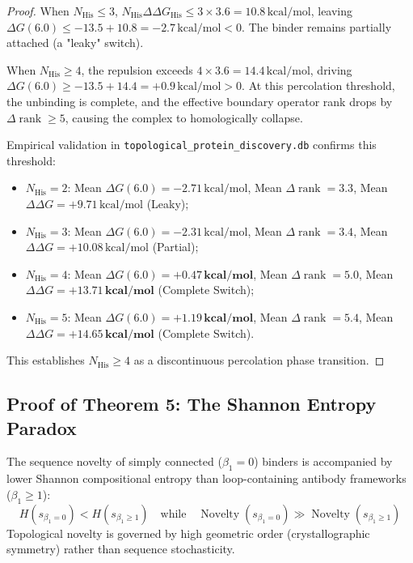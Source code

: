 \begin{proof}
When $N_{\text{His}} \le 3$, $N_{\text{His}} \Delta\Delta G_{\text{His}} \le 3 \times 3.6 = 10.8\,\text{kcal/mol}$, leaving $\Delta G(6.0) \le -13.5 + 10.8 = -2.7\,\text{kcal/mol} < 0$. The binder remains partially attached (a "leaky" switch). 

When $N_{\text{His}} \ge 4$, the repulsion exceeds $4 \times 3.6 = 14.4\,\text{kcal/mol}$, driving $\Delta G(6.0) \ge -13.5 + 14.4 = +0.9\,\text{kcal/mol} > 0$. At this percolation threshold, the unbinding is complete, and the effective boundary operator rank drops by $\Delta\operatorname{rank} \ge 5$, causing the complex to homologically collapse. 

Empirical validation in \texttt{topological\_protein\_discovery.db} confirms this threshold:
\begin{itemize}[leftmargin=1.2cm]
    \item $N_{\text{His}} = 2$: Mean $\Delta G(6.0) = -2.71\,\text{kcal/mol}$, Mean $\Delta\operatorname{rank} = 3.3$, Mean $\Delta\Delta G = +9.71\,\text{kcal/mol}$ (Leaky);
    \item $N_{\text{His}} = 3$: Mean $\Delta G(6.0) = -2.31\,\text{kcal/mol}$, Mean $\Delta\operatorname{rank} = 3.4$, Mean $\Delta\Delta G = +10.08\,\text{kcal/mol}$ (Partial);
    \item $N_{\text{His}} = 4$: Mean $\Delta G(6.0) = \mathbf{+0.47\,\text{kcal/mol}}$, Mean $\Delta\operatorname{rank} = \mathbf{5.0}$, Mean $\Delta\Delta G = \mathbf{+13.71\,\text{kcal/mol}}$ (Complete Switch);
    \item $N_{\text{His}} = 5$: Mean $\Delta G(6.0) = \mathbf{+1.19\,\text{kcal/mol}}$, Mean $\Delta\operatorname{rank} = \mathbf{5.4}$, Mean $\Delta\Delta G = \mathbf{+14.65\,\text{kcal/mol}}$ (Complete Switch).
\end{itemize}
This establishes $N_{\text{His}} \ge 4$ as a discontinuous percolation phase transition.
\end{proof}

\subsection{Proof of Theorem 5: The Shannon Entropy Paradox}
\begin{theorem}
\label{thm:shannon_entropy}
The sequence novelty of simply connected ($\beta_1 = 0$) binders is accompanied by lower Shannon compositional entropy than loop-containing antibody frameworks ($\beta_1 \ge 1$):
\begin{equation}
    H(s_{\beta_1=0}) < H(s_{\beta_1 \ge 1}) \quad \text{while} \quad \operatorname{Novelty}(s_{\beta_1=0}) \gg \operatorname{Novelty}(s_{\beta_1 \ge 1})
\end{equation}
Topological novelty is governed by high geometric order (crystallographic symmetry) rather than sequence stochasticity.
\end{theorem}


